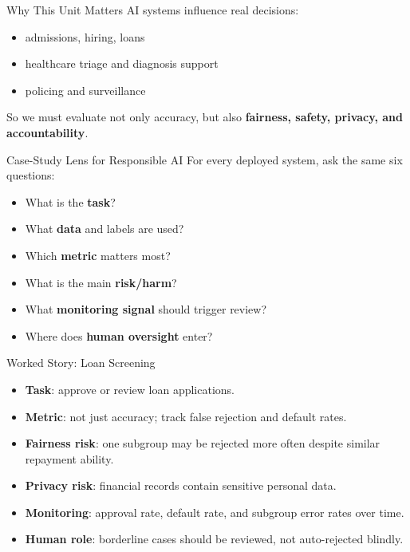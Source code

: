 \documentclass[aspectratio=169]{beamer}
\begin{document}
\begin{frame}{Why This Unit Matters}
  AI systems influence real decisions:
  \begin{itemize}[<+->]
    \item admissions, hiring, loans
    \item healthcare triage and diagnosis support
    \item policing and surveillance
  \end{itemize}
  \vspace{0.4em}
  So we must evaluate not only accuracy, but also \textbf{fairness, safety, privacy, and accountability}.
\end{frame}

\begin{frame}{Case-Study Lens for Responsible AI}
  For every deployed system, ask the same six questions:
  \begin{itemize}[<+->]
    \item What is the \textbf{task}?
    \item What \textbf{data} and labels are used?
    \item Which \textbf{metric} matters most?
    \item What is the main \textbf{risk/harm}?
    \item What \textbf{monitoring signal} should trigger review?
    \item Where does \textbf{human oversight} enter?
  \end{itemize}
\end{frame}

\begin{frame}{Worked Story: Loan Screening}
  \begin{itemize}[<+->]
    \item \textbf{Task}: approve or review loan applications.
    \item \textbf{Metric}: not just accuracy; track false rejection and default rates.
    \item \textbf{Fairness risk}: one subgroup may be rejected more often despite similar repayment ability.
    \item \textbf{Privacy risk}: financial records contain sensitive personal data.
    \item \textbf{Monitoring}: approval rate, default rate, and subgroup error rates over time.
    \item \textbf{Human role}: borderline cases should be reviewed, not auto-rejected blindly.
  \end{itemize}
\end{frame}
\end{document}
